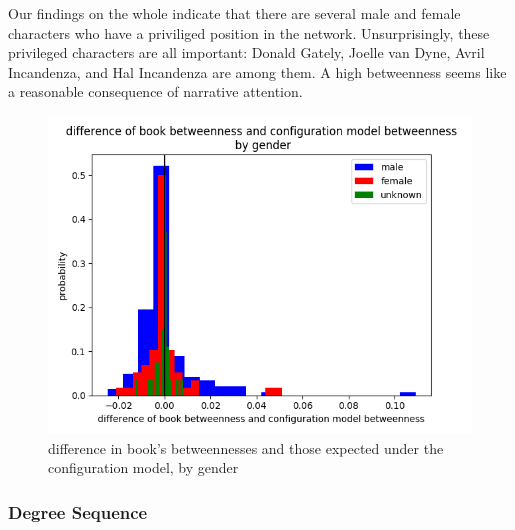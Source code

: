 Our findings on the whole indicate that there are several male and female characters who have a priviliged position in the network. Unsurprisingly, these privileged characters are all important: Donald Gately, Joelle van Dyne, Avril Incandenza, and Hal Incandenza are among them. A high betweenness seems like a reasonable consequence of narrative attention.
   
\begin{figure}[ht!]
    \centering
    \includegraphics[width=.4 \textwidth]{images/gender_betweenness_by_gender.png}
    \caption{difference in book's betweennesses and those expected under the configuration model, by gender}
    \label{difference-in-betweenness}
\end{figure}

\subsubsection{Degree Sequence}
 

